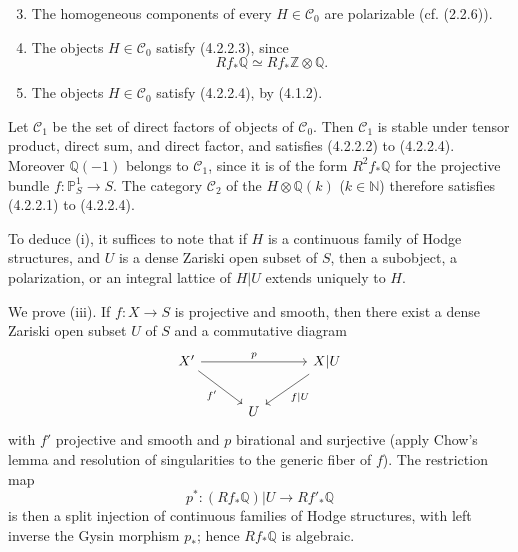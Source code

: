 \documentclass[10pt]{article}
\newcommand{\Q}{\mathbb Q}
\newcommand{\Z}{\mathbb Z}
\newcommand{\N}{\mathbb N}
\newcommand{\bbP}{\mathbb P}
\begin{document}
\begin{enumerate}[label=\alph*)]
\setcounter{enumi}{2}
\item The homogeneous components of every $H\in\mathcal C_0$ are polarizable (cf. (2.2.6)).
\item The objects $H\in\mathcal C_0$ satisfy (4.2.2.3), since
\[
Rf_*\Q\simeq Rf_*\Z\otimes\Q.
\]
\item The objects $H\in\mathcal C_0$ satisfy (4.2.2.4), by (4.1.2).
\end{enumerate}
Let $\mathcal C_1$ be the set of direct factors of objects of $\mathcal C_0$. Then $\mathcal C_1$ is stable under tensor product, direct sum, and direct factor, and satisfies (4.2.2.2) to (4.2.2.4). Moreover $\Q(-1)$ belongs to $\mathcal C_1$, since it is of the form $R^2f_*\Q$ for the projective bundle $f:\bbP^1_S\to S$. The category $\mathcal C_2$ of the $H\otimes\Q(k)$ ($k\in\N$) therefore satisfies (4.2.2.1) to (4.2.2.4).

To deduce (i), it suffices to note that if $H$ is a continuous family of Hodge structures, and $U$ is a dense Zariski open subset of $S$, then a subobject, a polarization, or an integral lattice of $H|U$ extends uniquely to $H$.

We prove (iii). If $f:X\to S$ is projective and smooth, then there exist a dense Zariski open subset $U$ of $S$ and a commutative diagram
\[
\begin{tikzcd}[column sep=3em,row sep=2em]
X' \arrow[rr,"p"] \arrow[dr,"f'"'] && X|U \arrow[dl,"f|U"]\\
& U &
\end{tikzcd}
\]
with $f'$ projective and smooth and $p$ birational and surjective (apply Chow's lemma and resolution of singularities to the generic fiber of $f$). The restriction map
\[
p^*:(Rf_*\Q)|U\longrightarrow Rf'_*\Q
\]
is then a split injection of continuous families of Hodge structures, with left inverse the Gysin morphism $p_*$; hence $Rf_*\Q$ is algebraic.

\begingroup
\renewcommand{\thefootnote}{(\arabic{footnote})}
\end{document}
